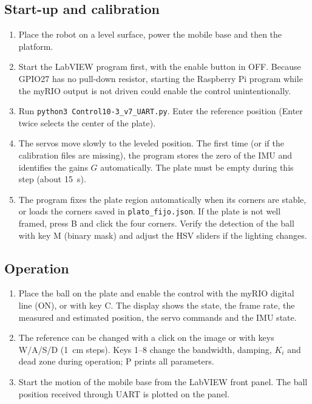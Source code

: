 \documentclass[11pt,letterpaper]{article}
\begin{document}
\subsection{Start-up and calibration}
\begin{enumerate}
    \item Place the robot on a level surface, power the mobile base and
    then the platform.
    \item Start the LabVIEW program first, with the enable button in
    OFF. Because GPIO27 has no pull-down resistor, starting the Raspberry
    Pi program while the myRIO output is not driven could enable the
    control unintentionally.
    \item Run \texttt{python3 Control10-3\_v7\_UART.py}. Enter the
    reference position (Enter twice selects the center of the plate).
    \item The servos move slowly to the leveled position. The first time
    (or if the calibration files are missing), the program stores the
    zero of the IMU and identifies the gains $G$ automatically. The
    plate must be empty during this step (about 15~s).
    \item The program fixes the plate region automatically when its
    corners are stable, or loads the corners saved in
    \texttt{plato\_fijo.json}. If the plate is not well framed, press B
    and click the four corners. Verify the detection of the ball with
    key M (binary mask) and adjust the HSV sliders if the lighting
    changes.
\end{enumerate}

\subsection{Operation}
\begin{enumerate}
    \item Place the ball on the plate and enable the control with the
    myRIO digital line (ON), or with key C. The display shows the state,
    the frame rate, the measured and estimated position, the servo
    commands and the IMU state.
    \item The reference can be changed with a click on the image or with
    keys W/A/S/D (1~cm steps). Keys 1--8 change the bandwidth, damping,
    $K_i$ and dead zone during operation; P prints all parameters.
    \item Start the motion of the mobile base from the LabVIEW front panel.
    The ball position received through UART is plotted on the panel.
\end{enumerate}
\end{document}
